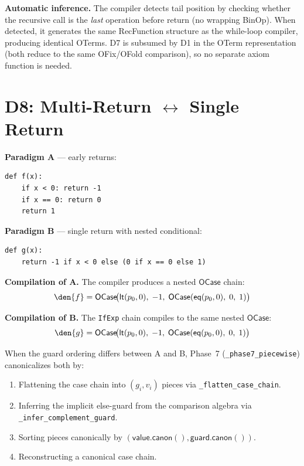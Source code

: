 \textbf{Automatic inference.}
The compiler detects tail position by checking whether the recursive
call is the \emph{last} operation before return (no wrapping BinOp).
When detected, it generates the same RecFunction structure as the
while-loop compiler, producing identical OTerms.
D7 is subsumed by D1 in the OTerm representation (both reduce to
the same OFix/OFold comparison), so no separate axiom function is
needed.


\section{D8: Multi-Return $\leftrightarrow$ Single Return}
\label{sec:d8}

\textbf{Paradigm A} --- early returns:
\begin{lstlisting}
def f(x):
    if x < 0: return -1
    if x == 0: return 0
    return 1
\end{lstlisting}

\textbf{Paradigm B} --- single return with nested conditional:
\begin{lstlisting}
def g(x):
    return -1 if x < 0 else (0 if x == 0 else 1)
\end{lstlisting}

\textbf{Compilation of A.}
The compiler produces a nested $\mathsf{OCase}$ chain:
\[
  \den{f} = \mathsf{OCase}\!\big(\mathsf{lt}(p_0, 0),\; -1,\;
    \mathsf{OCase}(\mathsf{eq}(p_0, 0),\; 0,\; 1)\big)
\]

\textbf{Compilation of B.}
The \texttt{IfExp} chain compiles to the same nested
$\mathsf{OCase}$:
\[
  \den{g} = \mathsf{OCase}\!\big(\mathsf{lt}(p_0, 0),\; -1,\;
    \mathsf{OCase}(\mathsf{eq}(p_0, 0),\; 0,\; 1)\big)
\]

When the guard ordering differs between A and B, Phase~7
(\texttt{\_phase7\_piecewise}) canonicalizes both by:
\begin{enumerate}
  \item Flattening the case chain into $(g_i, v_i)$ pieces
    via \texttt{\_flatten\_case\_chain}.
  \item Inferring the implicit else-guard from the comparison algebra
    via \texttt{\_infer\_complement\_guard}.
  \item Sorting pieces canonically by $(\mathsf{value.canon()},
    \mathsf{guard.canon()})$.
  \item Reconstructing a canonical case chain.
\end{enumerate}

